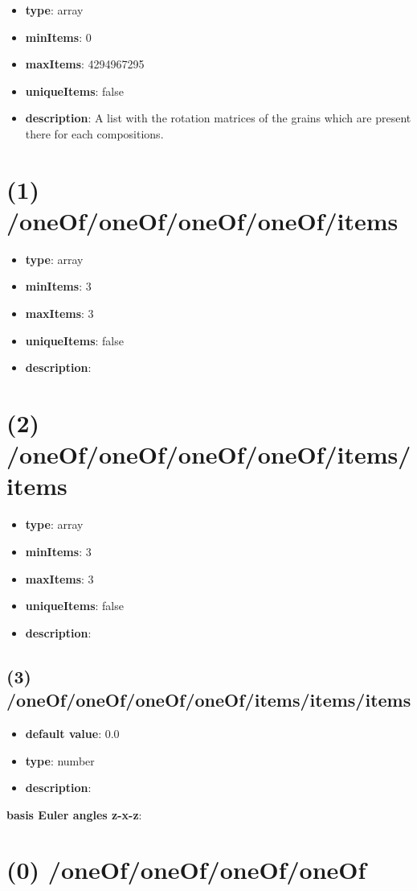 \begin{itemize}[leftmargin=0em]\item {\bf type}: array
\item {\bf minItems}: 0
\item {\bf maxItems}: 4294967295
\item {\bf uniqueItems}: false
\item {\bf description}: A list with the rotation matrices of the grains which are present there for each compositions.
\end{itemize}\section{(1) /oneOf/oneOf/oneOf/oneOf/items}
\begin{itemize}[leftmargin=1em]\item {\bf type}: array
\item {\bf minItems}: 3
\item {\bf maxItems}: 3
\item {\bf uniqueItems}: false
\item {\bf description}: 
\end{itemize}\section{(2) /oneOf/oneOf/oneOf/oneOf/items/items}
\begin{itemize}[leftmargin=2em]\item {\bf type}: array
\item {\bf minItems}: 3
\item {\bf maxItems}: 3
\item {\bf uniqueItems}: false
\item {\bf description}: 
\end{itemize}\subsection{(3) /oneOf/oneOf/oneOf/oneOf/items/items/items}
\begin{itemize}[leftmargin=3em]\item {\bf default value}: 0.0
\item {\bf type}: number
\item {\bf description}: 
\end{itemize}\item {\bf basis Euler angles z-x-z}: \section{(0) /oneOf/oneOf/oneOf/oneOf}
